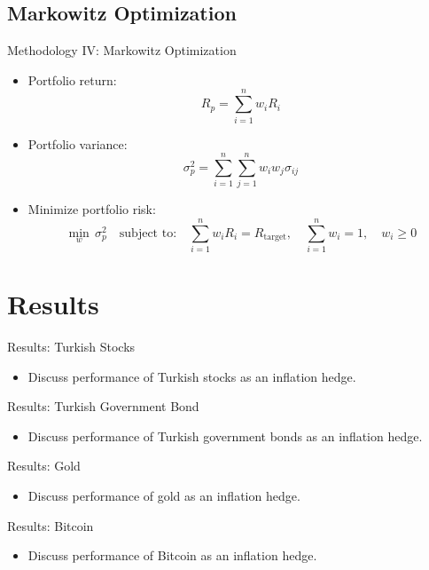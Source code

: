 \documentclass{beamer}
\begin{document}
\subsection{Markowitz Optimization}
\begin{frame}{Methodology IV: Markowitz Optimization}
\begin{itemize}
\item Portfolio return: \[
R_p = \sum_{i=1}^{n} w_i R_i
\]
\item Portfolio variance: \[
\sigma_p^2 = \sum_{i=1}^{n} \sum_{j=1}^{n} w_i w_j \sigma_{ij}
\]
\item Minimize portfolio risk: \[
\min_{w} \, \sigma_p^2 \quad \text{subject to:} \quad \sum_{i=1}^{n} w_i R_i = R_{\text{target}}, \quad \sum_{i=1}^{n} w_i = 1, \quad w_i \geq 0
\]
\end{itemize}
\end{frame}

\section{Results}
\begin{frame}{Results: Turkish Stocks}
\begin{itemize}
\tightlist
\item Discuss performance of Turkish stocks as an inflation hedge.
\end{itemize}
\end{frame}

\begin{frame}{Results: Turkish Government Bond}
\begin{itemize}
\tightlist
\item Discuss performance of Turkish government bonds as an inflation hedge.
\end{itemize}
\end{frame}

\begin{frame}{Results: Gold}
\begin{itemize}
\tightlist
\item Discuss performance of gold as an inflation hedge.
\end{itemize}
\end{frame}

\begin{frame}{Results: Bitcoin}
\begin{itemize}
\tightlist
\item Discuss performance of Bitcoin as an inflation hedge.
\end{itemize}
\end{frame}
\end{document}
